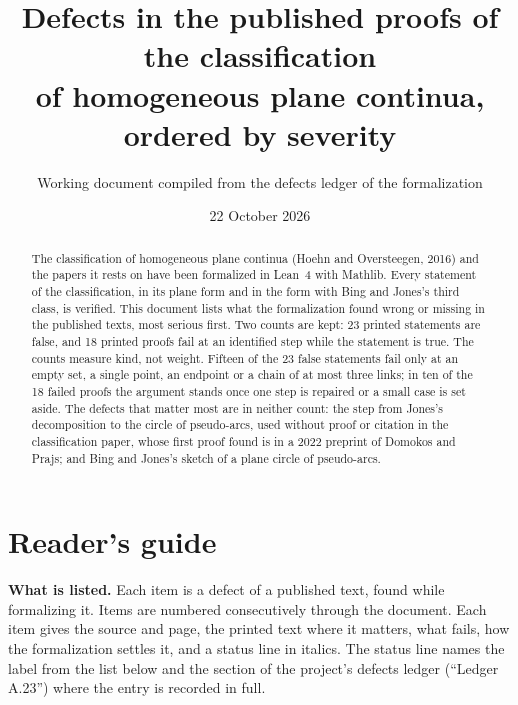 \documentclass[11pt]{article}
\title{Defects in the published proofs of the classification\\ of homogeneous plane continua,
  ordered by severity}
\author{Working document compiled from the defects ledger of the formalization}
\date{22 October 2026}
\newcounter{defect}
\begin{document}
\maketitle

\begin{abstract}
\noindent The classification of homogeneous plane continua (Hoehn and Oversteegen, 2016) and the
papers it rests on have been formalized in Lean~4 with Mathlib. Every statement of the
classification, in its plane form and in the form with Bing and Jones's third class, is verified.
This document lists what the formalization found wrong or missing in the published texts, most
serious first. Two counts are kept: 23 printed statements are false, and 18 printed proofs fail at
an identified step while the statement is true. The counts measure kind, not weight. Fifteen of
the 23 false statements fail only at an empty set, a single point, an endpoint or a chain of at
most three links; in ten of the 18 failed proofs the argument stands once one step is repaired or a
small case is set aside. The defects that matter most are in neither count: the step from Jones's
decomposition to the circle of pseudo-arcs, used without proof or citation in the classification
paper, whose first proof found is in a 2022 preprint of Domokos and Prajs; and Bing and Jones's
sketch of a plane circle of pseudo-arcs.
\end{abstract}

\tableofcontents

\section{Reader's guide}\label{sec:guide}

\textbf{What is listed.} Each item is a defect of a published text, found while formalizing it.
Items are numbered consecutively through the document. Each item gives the source and page, the
printed text where it matters, what fails, how the formalization settles it, and a status line
in italics. The status line names the label from the list below and the section of the project's
defects ledger (``Ledger A.23'') where the entry is recorded in full.
\end{document}
